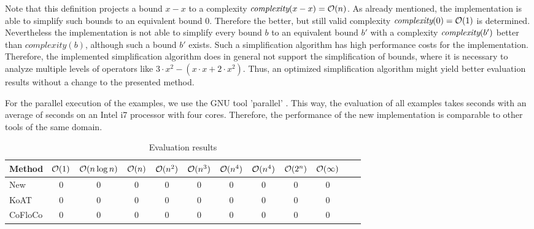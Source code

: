 Note that this definition projects a bound $x-x$ to a complexity $\emph{complexity}(x-x) = \mathcal{O}(n)$.
As already mentioned, the implementation is able to simplify such bounds to an equivalent bound $0$.
Therefore the better, but still valid complexity $\emph{complexity}(0) = \mathcal{O}(1)$ is determined.
Nevertheless the implementation is not able to simplify every bound $b$ to an equivalent bound $b'$ with a complexity $\emph{complexity}(b')$ better than $complexity(b)$, although such a bound $b'$ exists.
Such a simplification algorithm has high performance costs for the implementation.
Therefore, the implemented simplification algorithm does in general not support the simplification of bounds, where it is necessary to analyze multiple levels of operators like $3 \cdot x^2-(x \cdot x+2 \cdot x^2)$.
Thus, an optimized simplification algorithm might yield better evaluation results without a change to the presented method.

For the parallel execution of the examples, we use the GNU tool 'parallel' \cite{gnuparallel}.
This way, the evaluation of all examples takes  seconds with an average of  seconds on an Intel i7 processor with four cores.
Therefore, the performance of the new implementation is comparable to other tools of the same domain.

\begin{table}
  \begin{center}
    \label{tab:evaluation}
    \begin{tabular}{l|c|c|c|c|c|c|c|c|c|c|c}
      Method & $\mathcal{O}(1)$ & $\mathcal{O}(n \log n)$ & $\mathcal{O}(n)$ & $\mathcal{O}(n^2)$ & $\mathcal{O}(n^3)$ & $\mathcal{O}(n^4)$ & $\mathcal{O}(n^4)$ & $\mathcal{O}(2^n)$ & $\mathcal{O}(\infty)$\\
      \hline
      New      & 0 & 0 & 0 & 0 & 0 & 0 & 0 & 0 & 0\\
      KoAT     & 0 & 0 & 0 & 0 & 0 & 0 & 0 & 0 & 0\\
      CoFloCo  & 0 & 0 & 0 & 0 & 0 & 0 & 0 & 0 & 0\\
    \end{tabular}
  \end{center}
  \caption{Evaluation results}
\end{table}

